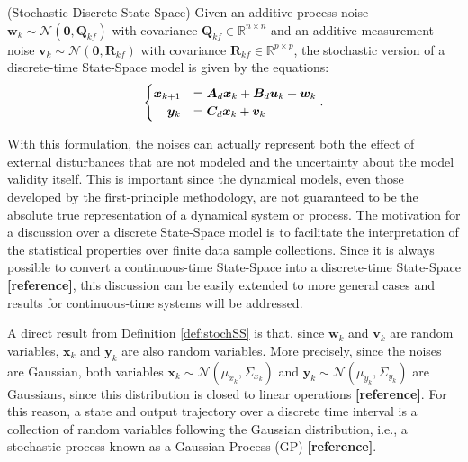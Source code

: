 \documentclass[a4paper,11pt]{book}
\numberwithin{figure}{chapter}
\numberwithin{equation}{chapter}
\numberwithin{table}{chapter}
\theoremstyle{definition}
\newtheorem{definition}{Definition}[chapter]
\newcounter{boxed-theorem}
\newcounter{boxed-definition}
\newenvironment{boxed-definition}[1]
{\begin{shaded} \begin{definition}{#1}}
{\end{definition} \end{shaded}}
\begin{document}
\begin{boxed-definition}{(Stochastic Discrete State-Space)} \label{def:stochSS}
    Given an additive process noise $\bm{w}_k \sim \mathcal{N}(\bm{0}, \bm{Q}_{kf})$ with covariance $\bm{Q}_{kf} \in \mathbb{R}^{n \times n}$ and an additive measurement noise $\bm{v}_k \sim \mathcal{N}(\bm{0}, \bm{R}_{kf})$ with covariance $\bm{R}_{kf} \in \mathbb{R}^{p \times p}$, the stochastic version of a discrete-time State-Space model is given by the equations:
    \begin{align}
    \begin{cases}
        \hfill \bm{x}_{k+1} &= \bm{A}_d \bm{x}_k + \bm{B}_d \bm{u}_k + \bm{w}_k \\
        \hfill \bm{y}_k &= \bm{C}_d \bm{x}_k + \bm{v}_k 
    \end{cases}
    .\end{align}
\end{boxed-definition}

With this formulation, the noises can actually represent both the effect of external disturbances that are not modeled and the uncertainty about the model validity itself. This is important since the dynamical models, even those developed by the first-principle methodology, are not guaranteed to be the absolute true representation of a dynamical system or process. The motivation for a discussion over a discrete State-Space model is to facilitate the interpretation of the statistical properties over finite data sample collections. Since it is always possible to convert a continuous-time State-Space into a discrete-time State-Space \textbf{[reference]}, this discussion can be easily extended to more general cases and results for continuous-time systems will be addressed. 

A direct result from Definition \ref{def:stochSS} is that, since $\bm{w}_k$ and $\bm{v}_k$ are random variables, $\bm{x}_k$ and $\bm{y}_k$ are also random variables. More precisely, since the noises are Gaussian, both variables $\bm{x}_k \sim \mathcal{N}(\mu_{x_k}, \Sigma_{x_k})$ and $\bm{y}_k \sim \mathcal{N}(\mu_{y_k}, \Sigma_{y_k})$ are Gaussians, since this distribution is closed to linear operations \textbf{[reference]}. For this reason, a state and output trajectory over a discrete time interval is a collection of random variables following the Gaussian distribution, i.e., a stochastic process known as a Gaussian Process (GP) \textbf{[reference]}.
\end{document}
